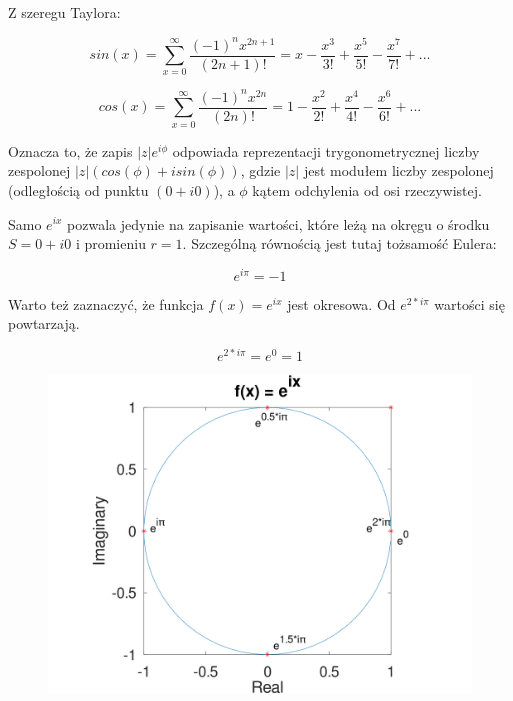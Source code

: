 \documentclass{article}
\begin{document}
Z szeregu Taylora:

\begin{equation}
    sin(x) = \sum_{x=0}^\infty \frac{(-1)^nx^{2n+1}}{(2n+1)!} = x - \frac{x^3}{3!} + \frac{x^5}{5!} - \frac{x^7}{7!} + ...
\end{equation}

\begin{equation}
    cos(x) = \sum_{x=0}^\infty \frac{(-1)^nx^{2n}}{(2n)!} = 1 - \frac{x^2}{2!} + \frac{x^4}{4!} - \frac{x^6}{6!} + ...
\end{equation}

Oznacza to, że zapis $|z|e^{i\phi}$ odpowiada reprezentacji trygonometrycznej liczby zespolonej $|z|(cos(\phi) + isin(\phi))$, gdzie $|z|$ jest modułem liczby zespolonej (odległością od punktu $(0 + i0)$), a $\phi$ kątem odchylenia od osi rzeczywistej.

Samo $e^{ix}$ pozwala jedynie na zapisanie wartości, które leżą na okręgu o środku $S=0+i0$ i promieniu $r=1$. Szczególną równością jest tutaj tożsamość Eulera:

\begin{equation}
    e^{i\pi}=-1
\end{equation}

Warto też zaznaczyć, że funkcja $f(x) = e^{ix}$ jest okresowa. Od $e^{2*i\pi}$ wartości się powtarzają.

\begin{equation}
    e^{2*i\pi}=e^0=1
\end{equation}

\begin{figure}
\includegraphics[width=1\textwidth]{euler.png}
\caption{}
\end{figure}
\end{document}
